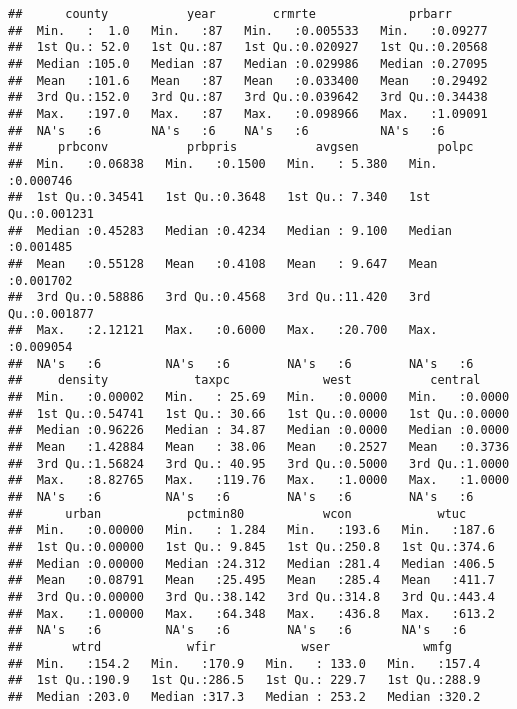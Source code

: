 \documentclass[]{article}
\begin{document}
\begin{verbatim}
##      county           year        crmrte             prbarr       
##  Min.   :  1.0   Min.   :87   Min.   :0.005533   Min.   :0.09277  
##  1st Qu.: 52.0   1st Qu.:87   1st Qu.:0.020927   1st Qu.:0.20568  
##  Median :105.0   Median :87   Median :0.029986   Median :0.27095  
##  Mean   :101.6   Mean   :87   Mean   :0.033400   Mean   :0.29492  
##  3rd Qu.:152.0   3rd Qu.:87   3rd Qu.:0.039642   3rd Qu.:0.34438  
##  Max.   :197.0   Max.   :87   Max.   :0.098966   Max.   :1.09091  
##  NA's   :6       NA's   :6    NA's   :6          NA's   :6        
##     prbconv           prbpris           avgsen           polpc         
##  Min.   :0.06838   Min.   :0.1500   Min.   : 5.380   Min.   :0.000746  
##  1st Qu.:0.34541   1st Qu.:0.3648   1st Qu.: 7.340   1st Qu.:0.001231  
##  Median :0.45283   Median :0.4234   Median : 9.100   Median :0.001485  
##  Mean   :0.55128   Mean   :0.4108   Mean   : 9.647   Mean   :0.001702  
##  3rd Qu.:0.58886   3rd Qu.:0.4568   3rd Qu.:11.420   3rd Qu.:0.001877  
##  Max.   :2.12121   Max.   :0.6000   Max.   :20.700   Max.   :0.009054  
##  NA's   :6         NA's   :6        NA's   :6        NA's   :6         
##     density            taxpc             west           central      
##  Min.   :0.00002   Min.   : 25.69   Min.   :0.0000   Min.   :0.0000  
##  1st Qu.:0.54741   1st Qu.: 30.66   1st Qu.:0.0000   1st Qu.:0.0000  
##  Median :0.96226   Median : 34.87   Median :0.0000   Median :0.0000  
##  Mean   :1.42884   Mean   : 38.06   Mean   :0.2527   Mean   :0.3736  
##  3rd Qu.:1.56824   3rd Qu.: 40.95   3rd Qu.:0.5000   3rd Qu.:1.0000  
##  Max.   :8.82765   Max.   :119.76   Max.   :1.0000   Max.   :1.0000  
##  NA's   :6         NA's   :6        NA's   :6        NA's   :6       
##      urban            pctmin80           wcon            wtuc      
##  Min.   :0.00000   Min.   : 1.284   Min.   :193.6   Min.   :187.6  
##  1st Qu.:0.00000   1st Qu.: 9.845   1st Qu.:250.8   1st Qu.:374.6  
##  Median :0.00000   Median :24.312   Median :281.4   Median :406.5  
##  Mean   :0.08791   Mean   :25.495   Mean   :285.4   Mean   :411.7  
##  3rd Qu.:0.00000   3rd Qu.:38.142   3rd Qu.:314.8   3rd Qu.:443.4  
##  Max.   :1.00000   Max.   :64.348   Max.   :436.8   Max.   :613.2  
##  NA's   :6         NA's   :6        NA's   :6       NA's   :6      
##       wtrd            wfir            wser             wmfg      
##  Min.   :154.2   Min.   :170.9   Min.   : 133.0   Min.   :157.4  
##  1st Qu.:190.9   1st Qu.:286.5   1st Qu.: 229.7   1st Qu.:288.9  
##  Median :203.0   Median :317.3   Median : 253.2   Median :320.2  

\end{verbatim}
\end{document}

